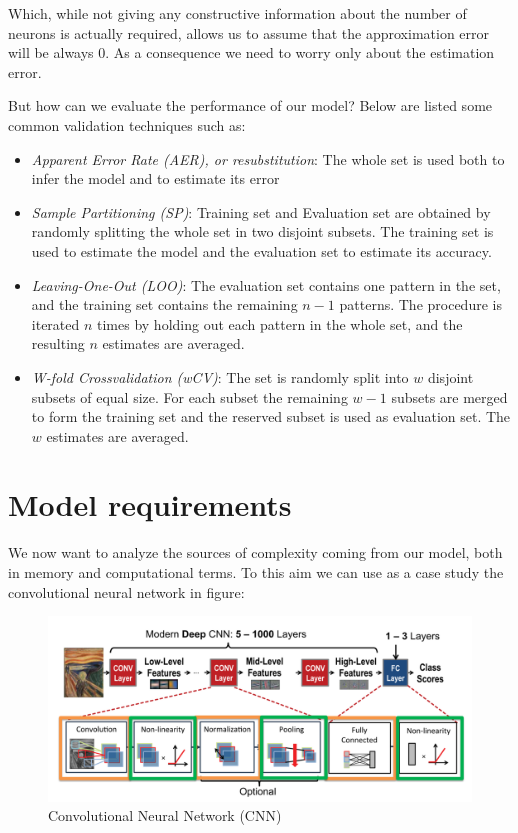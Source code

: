\documentclass{article}
\begin{document}
    Which, while not giving any constructive information about the number of neurons is actually required, allows us to assume that the approximation error will be always $0$. As a consequence we need to worry only about the estimation error.

    But how can we evaluate the performance of our model? Below are listed some common validation techniques such as:
    \begin{itemize}
      \item \emph{Apparent Error Rate (AER), or resubstitution}: The whole set is used both to infer the model and to estimate its error
      \item \emph{Sample Partitioning (SP)}: Training set and Evaluation set are obtained by randomly splitting the whole set in two disjoint subsets. The training set is used to estimate the model and the evaluation set to estimate its accuracy.
      \item \emph{Leaving-One-Out (LOO)}: The evaluation set contains one pattern in the set, and the training set contains the remaining $n - 1$ patterns. The procedure is iterated $n$ times by holding out each pattern in the whole set, and the resulting $n$ estimates are averaged.
      \item \emph{W-fold Crossvalidation (wCV)}: The set is randomly split into $w$ disjoint subsets of equal size. For each subset the remaining $w - 1$ subsets are merged to form the training set and the reserved subset is used as evaluation set. The $w$ estimates are averaged.
    \end{itemize}

  \newpage
  \section{Model requirements}
    We now want to analyze the sources of complexity coming from our model, both in memory and computational terms. To this aim we can use as a case study the convolutional neural network in figure:

    \begin{figure}[H]
      \includegraphics[scale=0.35]{../Images/CNN.png}
      \centering
      \caption{Convolutional Neural Network (CNN)}
    \end{figure}
    
\end{document}
